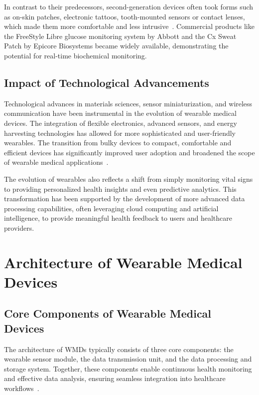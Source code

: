 \documentclass[journal]{IEEEtran}
\begin{document}
    In contrast to their predecessors, second-generation devices often took forms such as on-skin patches, electronic tattoos, tooth-mounted sensors or contact lenses, which made them more comfortable and less intrusive~\cite{Ates2022}. Commercial products like the FreeStyle Libre glucose monitoring system by Abbott and the Cx Sweat Patch by Epicore Biosystems became widely available, demonstrating the potential for real-time biochemical monitoring.

    \subsection{Impact of Technological Advancements}

    Technological advances in materials sciences, sensor miniaturization, and wireless communication have been instrumental in the evolution of wearable medical devices. The integration of flexible electronics, advanced sensors, and energy harvesting technologies has allowed for more sophisticated and user-friendly wearables. The transition from bulky devices to compact, comfortable and efficient devices has significantly improved user adoption and broadened the scope of wearable medical applications~\cite{Ates2022}.

    The evolution of wearables also reflects a shift from simply monitoring vital signs to providing personalized health insights and even predictive analytics. This transformation has been supported by the development of more advanced data processing capabilities, often leveraging cloud computing and artificial intelligence, to provide meaningful health feedback to users and healthcare providers.

\section{Architecture of Wearable Medical Devices}

    \subsection{Core Components of Wearable Medical Devices}
    The architecture of WMDs typically consists of three core components: the wearable sensor module, the data transmission unit, and the data processing and storage system. Together, these components enable continuous health monitoring and effective data analysis, ensuring seamless integration into healthcare workflows~\cite{Ates2022}.
    
\end{document}
